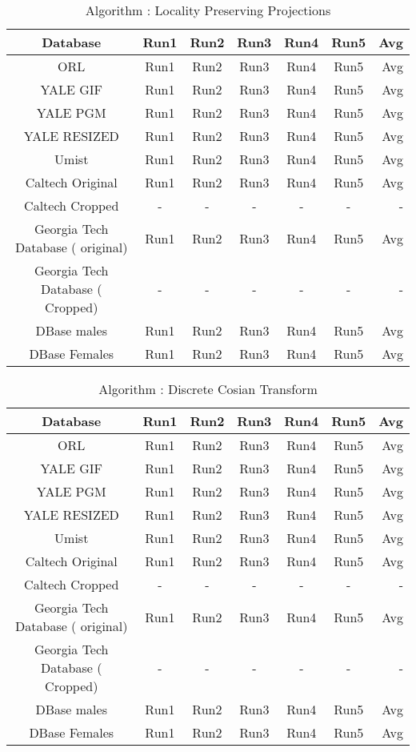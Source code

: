 \documentclass[10pt,a4paper]{article}
\begin{document}
\begin{center}
\begin{table}
\caption{Algorithm : Locality Preserving Projections }
\centering
\begin{tabular}{| c | c | c | c | c | c | r | } \hline 
Database & Run1 & Run2 & Run3 & Run4 & Run5 & Avg  \\  
\hline
ORL & Run1 & Run2 & Run3 & Run4 & Run5 & Avg \\
\hline
YALE GIF & Run1 & Run2 & Run3 & Run4 & Run5 & Avg \\
\hline
YALE PGM & Run1 & Run2 & Run3 & Run4 & Run5 & Avg \\
\hline
YALE RESIZED & Run1 & Run2 & Run3 & Run4 & Run5 & Avg \\
\hline
Umist & Run1 & Run2 & Run3 & Run4 & Run5 & Avg \\
\hline
Caltech Original & Run1 & Run2 & Run3 & Run4 & Run5 & Avg \\
\hline
Caltech Cropped & - & - & - & - & - & - \\ 
\hline
Georgia Tech Database ( original) & Run1 & Run2 & Run3 & Run4 & Run5 & Avg \\
\hline
Georgia Tech Database ( Cropped) & - & - & - & - & - & - \\ 
\hline
DBase males & Run1 & Run2 & Run3 & Run4 & Run5 & Avg \\
\hline
DBase Females  & Run1 & Run2 & Run3 & Run4 & Run5 & Avg \\
\hline
\end{tabular}
\end{table}

\begin{table}
\caption{Algorithm : Discrete Cosian Transform }
\centering
\begin{tabular}{| c | c | c | c | c | c | r | } \hline 
Database & Run1 & Run2 & Run3 & Run4 & Run5 & Avg  \\  
\hline
ORL & Run1 & Run2 & Run3 & Run4 & Run5 & Avg \\
\hline
YALE GIF & Run1 & Run2 & Run3 & Run4 & Run5 & Avg \\
\hline
YALE PGM & Run1 & Run2 & Run3 & Run4 & Run5 & Avg \\
\hline
YALE RESIZED & Run1 & Run2 & Run3 & Run4 & Run5 & Avg \\
\hline
Umist & Run1 & Run2 & Run3 & Run4 & Run5 & Avg \\
\hline
Caltech Original & Run1 & Run2 & Run3 & Run4 & Run5 & Avg \\
\hline
Caltech Cropped & - & - & - & - & - & - \\ 
\hline
Georgia Tech Database ( original) & Run1 & Run2 & Run3 & Run4 & Run5 & Avg \\
\hline
Georgia Tech Database ( Cropped) & - & - & - & - & - & - \\ 
\hline
DBase males & Run1 & Run2 & Run3 & Run4 & Run5 & Avg \\
\hline
DBase Females  & Run1 & Run2 & Run3 & Run4 & Run5 & Avg \\
\hline
\end{tabular}
\end{table}


\end{center}
\end{document}
